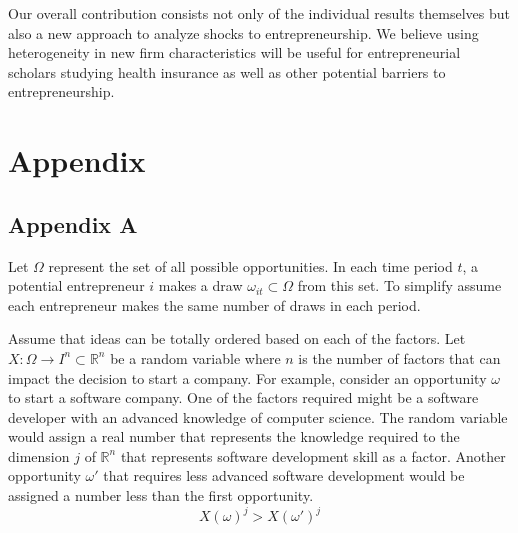 \documentclass[12pt]{article}
\begin{document}
Our overall contribution consists not only of the individual results themselves but also a new approach to analyze shocks to entrepreneurship. We believe using heterogeneity in new firm characteristics will be useful for entrepreneurial scholars studying health insurance as well as other potential barriers to entrepreneurship. 

\begin{comment}

Our results point the way to future research in this area. Our results may be sensitive to for example the subsidy schedule based on income implemented in Massachusetts. In addition, more precise firm creation data sources may allow us to make stronger statements about the types of industries that benefited from health care reform.


Reasons why no result is plausible: 
People will do this anyway
Cost of insurance is not covered; still expensive. 
People disuaded small sub-sample of entrepreneurs, pre-existing conditions or those with kids but no spousal insurance or access to VC funds

However 
Long and Dahlen \footnote{Long Dahlen 2014} and Long, Stockly and Nordahl \footnote{2012} show insurance rates increased primarily among low income, childless adults. Not the demographic for entrepreneurs. 

\end{comment}

\newpage

\appendix
\section*{Appendix}
\subsection*{Appendix A}

Let $\Omega$ represent the set of all possible opportunities. In each time period $t$, a potential entrepreneur $i$ makes a draw $\omega_{it} \subset \Omega$ from this set. To simplify assume each entrepreneur makes the same number of draws in each period. 

Assume that ideas can be totally ordered based on each of the factors. Let $X:\Omega\to I^n \subset \mathbb{R}^n$ be a random variable where $n$ is the number of factors that can impact the decision to start a company. For example, consider an opportunity $\omega$ to start a software company. One of the factors required might be a software developer with an advanced knowledge of computer science. The random variable would assign a real number that represents the knowledge required to the dimension $j$ of $\mathbb{R}^n$ that represents software development skill as a factor. Another opportunity $\omega'$ that requires less advanced software development would be assigned a number less than the first opportunity. 
$$X(\omega)^j > X(\omega')^j $$
\end{document}
